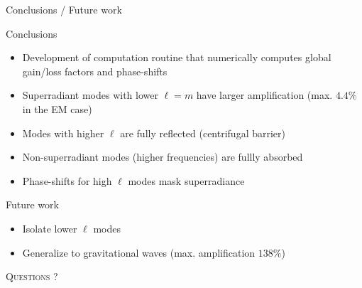 \documentclass[9pt]{beamer}
\begin{document}
\begin{frame}{Conclusions / Future work}
	\begin{block}{Conclusions}
		\begin{itemize}
			\setlength\itemsep{0.8em}
			\item Development of computation routine that numerically computes global gain/loss factors and phase-shifts
			\item Superradiant modes with lower $\ell=m$ have larger amplification (max. $4.4\%$ in the EM case)
			\item Modes with higher $\ell$ are fully reflected (centrifugal barrier)
			\item Non-superradiant modes (higher frequencies) are fullly absorbed
			\item Phase-shifts for high $\ell$ modes mask superradiance
		\end{itemize}
	\end{block}
	\begin{block}{Future work}
		\begin{itemize}
			\setlength\itemsep{0.8em}
			\item Isolate lower $\ell$ modes
			\item Generalize to gravitational waves (max. amplification $138\%$)
		\end{itemize}
	\end{block}
\end{frame}

\begin{frame}[standout]
	\Huge\textsc{Questions ?}
\end{frame}
\end{document}
